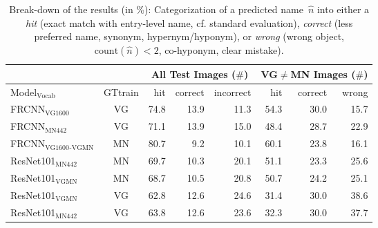 
\begin{table*}[t]
	\centering
	\small
	\begin{tabular}{l|c|r@{~}r@{~}r@{~}||r@{~}r@{~}r@{~}}
		\toprule
		& & \multicolumn{3}{c}{All Test Images ($\#$)} 
		& \multicolumn{3}{c}{VG$\neq$MN Images ($\#$)}\\
		\toprule
		Model$_{\text{Vocab}}$	& GTtrain  
		&  hit &  correct &  incorrect &  hit &  correct &  wrong \\
		\midrule
		FRCNN$_{\text{VG1600}}$ & VG           &         74.8 &                  13.9 &                    11.3 &         54.3 &                  30.0 &                    15.7 \\
		FRCNN$_{\text{MN442}}$ & VG &         71.1 &                  13.9 &                    15.0 &         48.4 &                  28.7 &                    22.9 \\
		\midrule \midrule
		FRCNN$_{\text{VG1600}}$$_{\text{-VGMN}}$ & MN %
		&         80.7 &                   9.2 &                    10.1 &         60.1 &                  23.8 &                    16.1 \\
		\midrule
		ResNet101$_{\text{MN442}}$ & MN %
		&         69.7 &                  10.3 &                    20.1 &         51.1 &                  23.3 &                    25.6 \\
		ResNet101$_{\text{VGMN}}$ & MN%
		&         68.7 &                  10.5 &                    20.8 &         50.7 &                  24.2 &                    25.1 \\
		ResNet101$_{\text{VGMN}}$ & VG %
		&         62.8 &                  12.6 &                    24.6 &         31.4 &                  30.0 &                    38.6 \\
		ResNet101$_{\text{MN442}}$ & VG %
		&         63.8 &                  12.6 &                    23.6 &         32.3 &                  30.0 &                    37.7 \\
		\bottomrule
	\end{tabular}
	\caption{Break-down of the results (in \%): Categorization of a predicted name\ $\hat{n}$ into either a \textit{hit} (exact match with entry-level name, cf. standard evaluation), \textit{correct} (less preferred name, synonym, hypernym/hyponym), or \textit{wrong} (wrong object, $\text{count}(\hat{n})<2$, co-hyponym, clear mistake). \label{tab:exp_overview_results}}
\end{table*}
